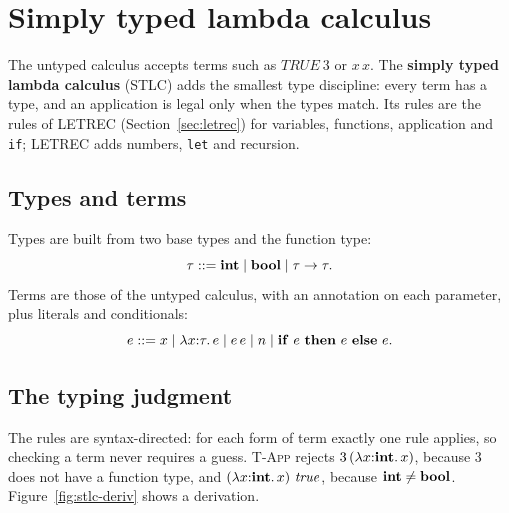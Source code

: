 \section{Simply typed lambda calculus}
\label{sec:stlc}

The untyped calculus accepts terms such as $\mathit{TRUE}\ 3$ or $x\, x$. The
\textbf{simply typed lambda calculus} (STLC) adds the smallest type discipline:
every term has a type, and an application is legal only when the types
match. Its rules are the rules of LETREC (Section~\ref{sec:letrec}) for
variables, functions, application and \texttt{if}; LETREC adds numbers,
\texttt{let} and recursion.

\subsection{Types and terms}

Types are built from two base types and the function type:
\[
\tau ::= \mathbf{int} \mid \mathbf{bool} \mid \tau \to \tau.
\]
Terms are those of the untyped calculus, with an annotation on each parameter,
plus literals and conditionals:
\[
e ::= x \mid \lambda x{:}\tau.\, e \mid e\, e \mid n \mid \mathbf{if}\ e\ \mathbf{then}\ e\ \mathbf{else}\ e.
\]

\subsection{The typing judgment}

The rules are syntax-directed: for each form of term exactly one rule
applies, so checking a term never requires a guess. \textsc{T-App} rejects
$3\, (\lambda x{:}\mathbf{int}.\, x)$, because 3 does not have a function type, and
$(\lambda x{:}\tyint.\, x)\ \mathit{true}$, because $\mathbf{int} \ne \mathbf{bool}$.
Figure~\ref{fig:stlc-deriv} shows a derivation.

